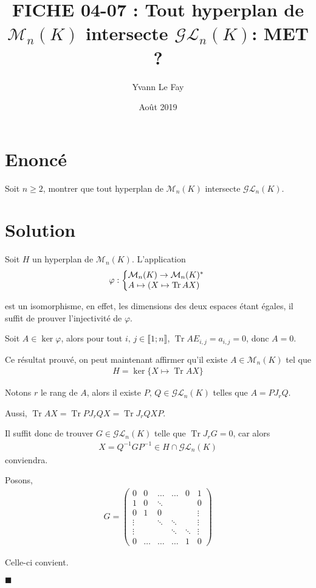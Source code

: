 \documentclass{article}
\newcommand*{\QED}{\hfill\ensuremath{\blacksquare}}%
\DeclareMathOperator{\tr}{Tr}
\begin{document}
\title{FICHE 04-07 : Tout hyperplan de $\mathcal{M}_n(K)$ intersecte $\mathcal{G}\mathcal{L}_n(K)$: MET ? }
\author{Yvann Le Fay}
\date{Août 2019}
\maketitle 
\section*{Enoncé}
Soit $n\geq 2$, montrer que tout hyperplan de $\mathcal{M}_n(K)$ intersecte $\mathcal{G}\mathcal{L}_n(K)$.
\section*{Solution}
Soit $H$ un hyperplan de $\mathcal{M}_n(K)$. L'application 
\begin{align*}
	\varphi : \left\{
		\begin{array}{@{}l@{\thinspace}l}
			\mathcal{M}_n(K)\to \mathcal{M}_n(K)^*\\
			A \mapsto (X\mapsto \tr{AX})
		\end{array}
	\right.
\end{align*}

est un isomorphisme, en effet, les dimensions des deux espaces étant égales, il suffit de prouver l'injectivité de $\varphi$.

Soit $A\in \ker \varphi$, alors pour tout $i,\,j\in \llbracket 1;n\rrbracket$, $\tr{AE_{i,j}} = a_{i,j} = 0$, donc $A=0$. 

Ce résultat prouvé, on peut maintenant affirmer qu'il existe $A\in \mathcal{M}_n(K)$ tel que 
\begin{align*}
	H = \ker \{X \mapsto \tr{AX}\}
\end{align*}

Notons $r$ le rang de $A$, alors il existe $P,\, Q\in\mathcal{G}\mathcal{L}_n(K)$ telles que $A = PJ_rQ$. 

Aussi, $\tr{AX} = \tr{PJ_rQX}=\tr{J_rQXP}$. 

Il suffit donc de trouver $G\in \mathcal{G}\mathcal{L}_n(K)$ telle que $\tr{J_rG} = 0$, car alors 
\begin{align*}
	X = Q^{-1}GP^{-1}\in H\cap \mathcal{G}\mathcal{L}_n(K)
\end{align*}
conviendra. 

Posons, 
\begin{align*}
	G = \begin{pmatrix}
		0 & 0 & \ldots & \ldots & 0 & 1\\
		1 & 0 & \ddots & & & 0\\
		0 & 1 & 0 & & & \vdots\\
		\vdots & &\ddots &\ddots & &\vdots \\
		\vdots & &&\ddots & \ddots & \vdots \\
		0 & \hdots & \hdots & \hdots & 1 & 0 
	\end{pmatrix}
\end{align*}

Celle-ci convient. 

\QED
\end{document}
